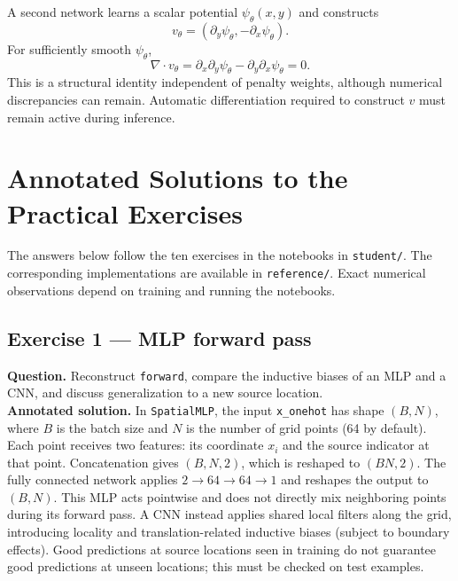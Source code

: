 \documentclass[11pt,a4paper]{article}
\begin{document}
A second network learns a scalar potential $\psi_\theta(x,y)$ and constructs
\[\boxed{v_\theta=(\partial_y\psi_\theta,-\partial_x\psi_\theta).}\]
For sufficiently smooth $\psi_\theta$,
\[\nabla\cdot v_\theta=\partial_x\partial_y\psi_\theta-\partial_y\partial_x\psi_\theta=0.\]
This is a structural identity independent of penalty weights, although numerical discrepancies can remain. Automatic differentiation required to construct $v$ must remain active during inference.
\begin{center}\end{center}

\section{Annotated Solutions to the Practical Exercises}

The answers below follow the ten exercises in the notebooks in
\texttt{student/}. The corresponding implementations are available
in \texttt{reference/}. Exact numerical observations depend on
training and running the notebooks.

\subsection{Exercise 1 --- MLP forward pass}

\noindent \textbf{Question.} Reconstruct \texttt{forward}, compare the inductive
biases of an MLP and a CNN, and discuss generalization to a new
source location.
\\

\noindent \textbf{Annotated solution.} In \texttt{SpatialMLP}, the input
\texttt{x\_onehot} has shape $(B,N)$, where $B$ is the batch size
and $N$ is the number of grid points (64 by default). Each point
receives two features: its coordinate $x_i$ and the source
indicator at that point. Concatenation gives $(B,N,2)$, which
is reshaped to $(BN,2)$. The fully connected network applies
$2\to64\to64\to1$ and reshapes the output to $(B,N)$.
This MLP acts pointwise and does not directly mix neighboring
points during its forward pass. A CNN instead applies shared
local filters along the grid, introducing locality and
translation-related inductive biases (subject to boundary
effects). Good predictions at source locations seen in
training do not guarantee good predictions at unseen
locations; this must be checked on test examples.
\end{document}
